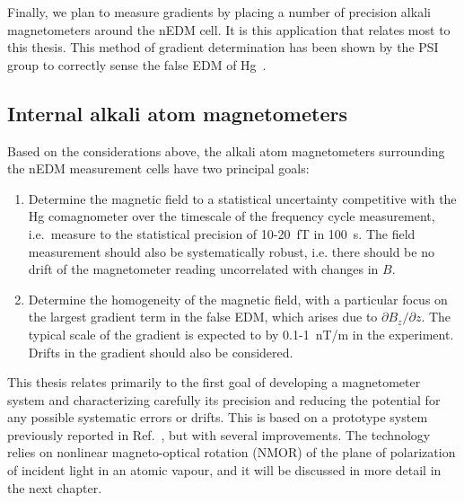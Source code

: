 Finally, we plan to measure gradients by placing a number of precision
alkali magnetometers around the nEDM cell.  It is this application
that relates most to this thesis.  This method of gradient
determination has been shown by the PSI group to correctly sense the
false EDM of Hg~\cite{bib:afach2015}.

\subsection{Internal alkali atom magnetometers}

Based on the considerations above, the alkali atom magnetometers
surrounding the nEDM measurement cells have two principal goals:
\begin{enumerate}
\item Determine the magnetic field to a statistical uncertainty
  competitive with the Hg comagnometer over the timescale of the
  frequency cycle measurement,  i.e.~measure to the statistical
  precision of 10-20~fT in 100~s.  The field measurement should also
  be systematically robust, i.e. there should be no drift of the
  magnetometer reading uncorrelated with changes in $B$.
\item Determine the homogeneity of the magnetic field, with a
  particular focus on the largest gradient term in the false EDM,
  which arises due to $\partial B_z/\partial z$.  The typical scale of
  the gradient is expected to by 0.1-1~nT/m in the experiment.  Drifts
  in the gradient should also be considered.
\end{enumerate}
This thesis relates primarily to the first goal of developing a
magnetometer system and characterizing carefully its precision and
reducing the potential for any possible systematic errors or drifts.
This is based on a prototype system previously reported in
Ref.~\cite{bib:our-nmor-paper}, but with several improvements.  The
technology relies on nonlinear magneto-optical rotation (NMOR) of the
plane of polarization of incident light in an atomic vapour, and it
will be discussed in more detail in the next chapter.




